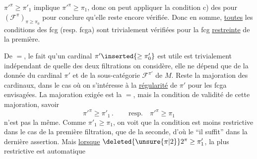 $\pi'^{\pi}\geq\pi'_1$ implique $\pi'^{\pi}\geq\pi_1$, donc on peut appliquer
la condition c) des  pour $(\mathcal F^\pi)_{\pi\geq\pi_0}$ pour
conclure qu'elle reste encore vérifiée. Donc
en somme, \uline{toutes} les conditions des fcg
(resp. fcga) sont trivialement vérifiées pour
la fcg \uline{restreinte} de la première.

De $=$, le fait qu'un cardinal $\pi'\inserted{\geq\pi'_0}$ est
utile  est trivialement indépendant de
quelle des deux filtrations on considère,
elle ne dépend que de la donnée du
cardinal $\pi'$ et de la sous-catégorie $\mathcal F^{\pi'}$
de $M$. Reste la majoration des cardinaux, dans le cas où on s'intéresse à
la \uline{régularité} de $\pi'$ pour les  fcga
envisagées. La majoration exigée est
la $=$, mais la condition  de
validité de cette majoration, savoir
\[
\pi'^{\pi}\geq\pi'_1\mathpunct{.}\qquad\text{resp.}\quad\pi'^{\pi}\geq\pi_1
\]
n'est pas la même. Comme $\pi'_1\geq\pi_1$,
on voit que la condition  est
moins restrictive dans le cas de la
première filtration, que de la seconde, d'où
le ``il suffit'' dans la dernière assertion. Mais
\uline{lorsque} $\deleted{\unsure{\pi|2}}2^\pi\geq\pi'_1$,  la plus restrictive est automatique%
